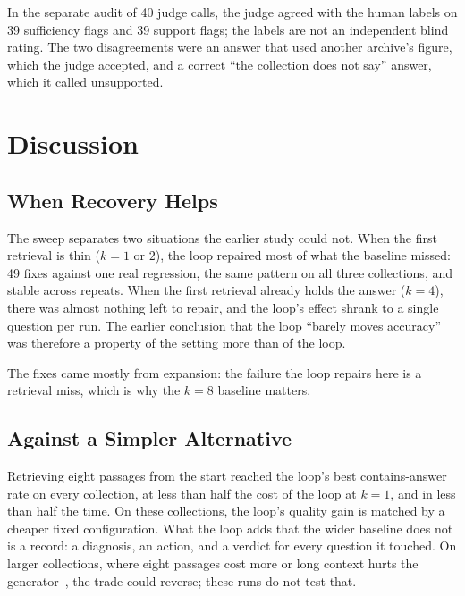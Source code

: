\documentclass[12pt, a4paper, oneside]{report}
\begin{document}
In the separate audit of 40 judge calls, the judge agreed with the human
labels on 39 sufficiency flags and 39 support flags; the labels are not an
independent blind rating. The two disagreements were an answer that used
another archive's figure, which the judge accepted, and a correct ``the
collection does not say'' answer, which it called unsupported.


\chapter{Discussion}
\label{discussion}

\section{When Recovery Helps}

The sweep separates two situations the earlier study could not. When the
first retrieval is thin ($k=1$ or $2$), the loop repaired most of what the
baseline missed: 49 fixes against one real regression, the same
pattern on all three collections, and stable across repeats. When the first
retrieval already holds the answer ($k=4$), there was almost nothing left
to repair, and the loop's effect shrank to a single question per run. The
earlier conclusion that the loop ``barely moves accuracy'' was therefore a
property of the setting more than of the loop.

The fixes came mostly from expansion: the failure the loop repairs here is
a retrieval miss, which is why the $k=8$ baseline matters.

\section{Against a Simpler Alternative}

Retrieving eight passages from the start reached the loop's best
contains-answer rate on every collection, at less than half the cost of the
loop at $k=1$, and in less than half the time. On these collections, the
loop's quality gain is matched by a cheaper fixed configuration. What the
loop adds that the wider baseline does not is a record: a diagnosis, an
action, and a verdict for every question it touched. On larger
collections, where eight passages cost more or long context hurts the
generator~\cite{liu2024lost}, the trade could reverse; these runs do not test that.
\end{document}
